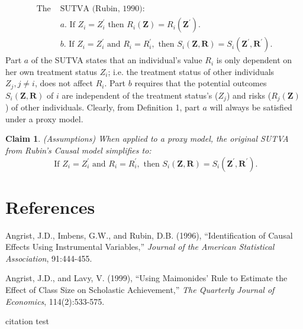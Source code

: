 \documentclass[12pt]{article}
\newtheorem{claim}{Claim}
\begin{document}
\begin{equation*}
\label{eq_sutva}
\begin{split}
\text{The }&\text{SUTVA (Rubin, 1990):}\\
& a. \text{ If } Z_{i} = Z_{i}^{\prime} \text{ then } R_{i}(\mathbf{Z}) = R_{i}(\mathbf{Z}^{\prime}).\\
& b. \text{ If } Z_{i} = Z_{i}^{\prime} \text{ and } R_i = R_{i}^{\prime}, \text{ then } S_{i}(\mathbf{Z}, \mathbf{R})=S_{i}(\mathbf{Z}^{\prime}, \mathbf{R}^{\prime}).
\end{split}
\end{equation*}
Part $a$ of the SUTVA states that an individual's value $R_i$ is only dependent on her own treatment status $Z_i$; i.e. the treatment status of other individuals $Z_j, j \neq i$, does not affect $R_i$. Part $b$ requires that the potential outcomes $S_{i}(\mathbf{Z}, \mathbf{R})$ of $i$ are independent of the treatment status's ($Z_j$) and risks ($R_{j}(\mathbf{Z})$) of other individuals. Clearly, from Definition 1, part $a$ will always be satisfied under a proxy model.
\begin{claim} (Assumptions) When applied to a proxy model, the original SUTVA from Rubin's Causal model simplifies to:
\begin{equation*}
\text{ If } Z_{i} = Z_{i}^{\prime} \text{ and } R_i = R_{i}^{\prime}, \text{ then } S_{i}(\mathbf{Z}, \mathbf{R})=S_{i}(\mathbf{Z}^{\prime}, \mathbf{R}^{\prime}).
\end{equation*}
\end{claim}


\newpage
\section*{References}
\begin{footnotesize}

\begin{description}

\item Angrist, J.D., Imbens, G.W., and Rubin, D.B. (1996), ``Identification of Causal Effects Using Instrumental Variables,'' \emph{Journal of the American Statistical Association}, 91:444-455. 

\item Angrist, J.D., and Lavy, V. (1999), ``Using Maimonides' Rule to Estimate the Effect of Class Size on Scholastic Achievement,'' \emph{The Quarterly Journal of Economics}, 114(2):533-575.


\end{description}
\end{footnotesize}\newpage

citation test \cite{latexcompanion}



\end{document}
